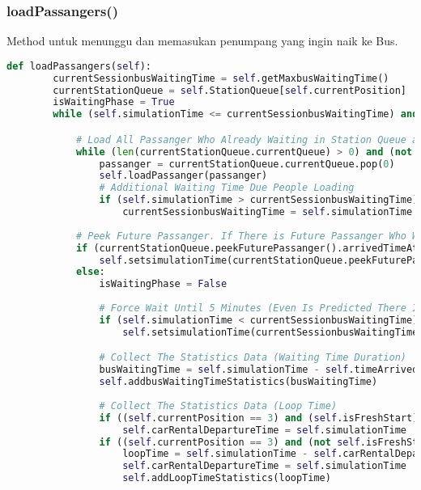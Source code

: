 \documentclass{article}
\begin{document}
\subsubsection{loadPassangers()}
Method untuk menunggu dan memasukan penumpang yang ingin naik ke Bus. 
\begin{lstlisting}[language=Python]
def loadPassangers(self):
		currentSessionbusWaitingTime = self.getMaxbusWaitingTime()
		currentStationQueue = self.StationQueue[self.currentPosition]
		isWaitingPhase = True
		while (self.simulationTime <= currentSessionbusWaitingTime) and (not self.isFull()) and (isWaitingPhase):

			# Load All Passanger Who Already Waiting in Station Queue as Long Bus is Not Full
			while (len(currentStationQueue.currentQueue) > 0) and (not self.isFull()):
				passanger = currentStationQueue.currentQueue.pop(0)
				self.loadPassanger(passanger)
				# Additional Waiting Time Due People Loading
				if (self.simulationTime > currentSessionbusWaitingTime):
					currentSessionbusWaitingTime = self.simulationTime
			
			# Peek Future Passanger. If There is Future Passanger Who Will Come Faster Before WaitTime Ends. Wait. If No. Wait Until WaitTime Ends. Then Go..
			if (currentStationQueue.peekFuturePassanger().arrivedTimeAtOriginStation <= currentSessionbusWaitingTime):
				self.setsimulationTime(currentStationQueue.peekFuturePassanger().arrivedTimeAtOriginStation)
			else:
				isWaitingPhase = False
				
				# Force Wait Until 5 Minutes (Even Is Predicted There Is No Passanger Will Come Anyway)
				if (self.simulationTime < currentSessionbusWaitingTime):
					self.setsimulationTime(currentSessionbusWaitingTime)

				# Collect The Statistics Data (Waiting Time Duration)	
				busWaitingTime = self.simulationTime - self.timeArrivedAtStation
				self.addbusWaitingTimeStatistics(busWaitingTime)
				
				# Collect The Statistics Data (Loop Time)
				if ((self.currentPosition == 3) and (self.isFreshStart)):
					self.carRentalDepartureTime = self.simulationTime
				if ((self.currentPosition == 3) and (not self.isFreshStart)):
					loopTime = self.simulationTime - self.carRentalDepartureTime
					self.carRentalDepartureTime = self.simulationTime
					self.addLoopTimeStatistics(loopTime)

\end{lstlisting}
\end{document}
